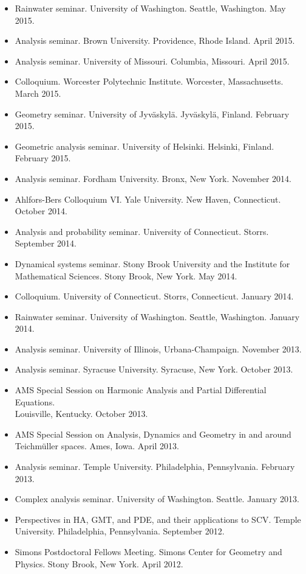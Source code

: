 \documentclass[12pt]{amsart}
\begin{document}
\begin{itemize}
\item Rainwater seminar. University of Washington. Seattle, Washington. May 2015.
\item Analysis seminar. Brown University. Providence, Rhode Island. April 2015.
\item Analysis seminar. University of Missouri. Columbia, Missouri. April 2015.
\item Colloquium. Worcester Polytechnic Institute. Worcester, Massachusetts. March 2015.
\item Geometry seminar. University of Jyv\"askyl\"a. Jyv\"askyl\"a, Finland. February 2015.
\item Geometric analysis seminar. University of Helsinki. Helsinki, Finland. February 2015.
\item Analysis seminar. Fordham University. Bronx, New York. November 2014.
\item Ahlfors-Bers Colloquium VI. Yale University. New Haven, Connecticut. October 2014.
\item Analysis and probability seminar. University of Connecticut. Storrs. September 2014.
\item Dynamical systems seminar. Stony Brook University and the Institute for Mathematical Sciences. Stony Brook, New York. May 2014.
\item Colloquium. University of Connecticut. Storrs, Connecticut. January 2014.
\item Rainwater seminar. University of Washington. Seattle, Washington. January 2014.
\item Analysis seminar. University of Illinois, Urbana-Champaign. November 2013.
\item Analysis seminar. Syracuse University. Syracuse, New York. October 2013.
\item AMS Special Session on Harmonic Analysis and Partial Differential Equations.\\ Louisville, Kentucky. October 2013.
\item AMS Special Session on Analysis, Dynamics and Geometry in and around Teichm\"uller spaces. Ames, Iowa. April 2013.
\item Analysis seminar. Temple University. Philadelphia, Pennsylvania. February 2013.
\item Complex analysis seminar. University of Washington. Seattle. January 2013.
\item Perspectives in HA, GMT, and PDE, and their applications to SCV. Temple University. Philadelphia, Pennsylvania. September 2012.
\item Simons Postdoctoral Fellows Meeting. Simons Center for Geometry and Physics. Stony Brook, New York. April 2012.

\end{itemize}
\end{document}
